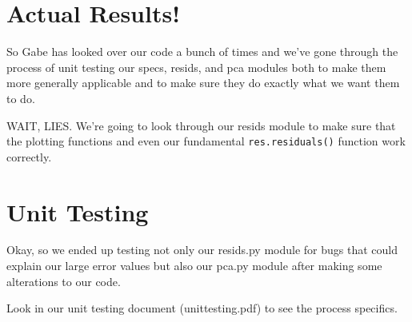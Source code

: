 \documentclass{article}
\begin{document}
\section{Actual Results!}
\label{forrealz}

So Gabe has looked over our code a bunch of times and we've gone
through the process of unit testing our specs, resids, and pca modules
both to make them more generally applicable and to make sure they do
exactly what we want them to do.

WAIT, LIES.  We're going to look through our resids module to make
sure that the plotting functions and even our fundamental
\verb|res.residuals()| function work correctly.

\section{Unit Testing}
\label{sec:testing}

Okay, so we ended up testing not only our resids.py module for bugs
that could explain our large error values but also our pca.py module
after making some alterations to our code.

Look in our unit testing document (unittesting.pdf) to see the process
specifics.
\end{document}
